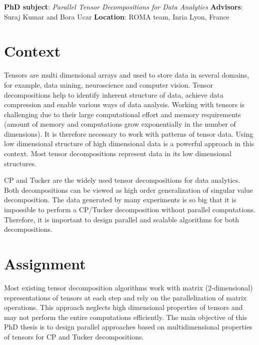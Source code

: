 \documentclass[a4paper]{article}
\date{}
\begin{document}
\noindent\textbf{PhD subject}: \emph{Parallel Tensor Decompositions for Data Analytics}\newline
\textbf{Advisors}: Suraj Kumar and Bora Ucar\newline
\textbf{Location}: ROMA team, Inria Lyon, France
\section*{Context}
Tensors are multi dimensional arrays and used to store data in several domains, for example, data mining, neuroscience and computer vision. Tensor decompositions help to identify inherent structure of data, achieve data compression and enable various ways of data analysis. Working with tensors is challenging due to their large computational effort and memory requirements (amount of memory and computations grow exponentially in the number of dimensions). It is therefore necessary to work with patterns of tensor data. Using low dimensional structure of high dimensional data is a powerful approach in this context. Most tensor decompositions represent data in its low dimensional structures.

CP and Tucker are the widely used tensor decompositions for data analytics. Both decompositions can be viewed as high order generalization of singular value decomposition. The data generated by many experiments is so big that it is impossible to perform a CP/Tucker decomposition without parallel computations. Therefore, it is important to design parallel and scalable algorithms for both decompositions.






\section*{Assignment}
Most existing tensor decomposition algorithms work with matrix (2-dimensional) representations of tensors at each step and rely on the parallelization of matrix operations. This approach neglects high dimensional properties of tensors and may not perform the entire computations efficiently. The main objective of this PhD thesis is to design parallel approaches based on multidimensional properties of tensors for CP and Tucker decompositions. 
\end{document}

